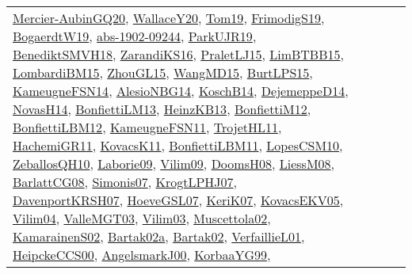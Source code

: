 {\begin{longtable}{lp{3cm}>{\raggedright}p{6cm}>{\raggedright}p{6cm}p{8cm}}
\href{papers/Mercier-AubinGQ20.pdf}{Mercier-AubinGQ20}\cite{Mercier-AubinGQ20}, \href{articles/WallaceY20.pdf}{WallaceY20}\cite{WallaceY20}, \href{papers/Tom19.pdf}{Tom19}\cite{Tom19}, \href{papers/FrimodigS19.pdf}{FrimodigS19}\cite{FrimodigS19}, \href{papers/BogaerdtW19.pdf}{BogaerdtW19}\cite{BogaerdtW19}, \href{articles/abs-1902-09244.pdf}{abs-1902-09244}\cite{abs-1902-09244}, \href{papers/ParkUJR19.pdf}{ParkUJR19}\cite{ParkUJR19}, \href{papers/BenediktSMVH18.pdf}{BenediktSMVH18}\cite{BenediktSMVH18}, \href{articles/ZarandiKS16.pdf}{ZarandiKS16}\cite{ZarandiKS16}, \href{papers/PraletLJ15.pdf}{PraletLJ15}\cite{PraletLJ15}, \href{papers/LimBTBB15.pdf}{LimBTBB15}\cite{LimBTBB15}, \href{papers/LombardiBM15.pdf}{LombardiBM15}\cite{LombardiBM15}, \href{papers/ZhouGL15.pdf}{ZhouGL15}\cite{ZhouGL15}, \href{articles/WangMD15.pdf}{WangMD15}\cite{WangMD15}, \href{papers/BurtLPS15.pdf}{BurtLPS15}\cite{BurtLPS15}, \href{articles/KameugneFSN14.pdf}{KameugneFSN14}\cite{KameugneFSN14}, \href{papers/AlesioNBG14.pdf}{AlesioNBG14}\cite{AlesioNBG14}, \href{papers/KoschB14.pdf}{KoschB14}\cite{KoschB14}, \href{papers/DejemeppeD14.pdf}{DejemeppeD14}\cite{DejemeppeD14}, \href{articles/NovasH14.pdf}{NovasH14}\cite{NovasH14}, \href{papers/BonfiettiLM13.pdf}{BonfiettiLM13}\cite{BonfiettiLM13}, \href{papers/HeinzKB13.pdf}{HeinzKB13}\cite{HeinzKB13}, \href{papers/BonfiettiM12.pdf}{BonfiettiM12}\cite{BonfiettiM12}, \href{papers/BonfiettiLBM12.pdf}{BonfiettiLBM12}\cite{BonfiettiLBM12}, \href{papers/KameugneFSN11.pdf}{KameugneFSN11}\cite{KameugneFSN11}, \href{articles/TrojetHL11.pdf}{TrojetHL11}\cite{TrojetHL11}, \href{articles/HachemiGR11.pdf}{HachemiGR11}\cite{HachemiGR11}, \href{articles/KovacsK11.pdf}{KovacsK11}\cite{KovacsK11}, \href{papers/BonfiettiLBM11.pdf}{BonfiettiLBM11}\cite{BonfiettiLBM11}, \href{articles/LopesCSM10.pdf}{LopesCSM10}\cite{LopesCSM10}, \href{articles/ZeballosQH10.pdf}{ZeballosQH10}\cite{ZeballosQH10}, \href{papers/Laborie09.pdf}{Laborie09}\cite{Laborie09}, \href{papers/Vilim09.pdf}{Vilim09}\cite{Vilim09}, \href{papers/DoomsH08.pdf}{DoomsH08}\cite{DoomsH08}, \href{articles/LiessM08.pdf}{LiessM08}\cite{LiessM08}, \href{papers/BarlattCG08.pdf}{BarlattCG08}\cite{BarlattCG08}, \href{articles/Simonis07.pdf}{Simonis07}\cite{Simonis07}, \href{papers/KrogtLPHJ07.pdf}{KrogtLPHJ07}\cite{KrogtLPHJ07}, \href{papers/DavenportKRSH07.pdf}{DavenportKRSH07}\cite{DavenportKRSH07}, \href{papers/HoeveGSL07.pdf}{HoeveGSL07}\cite{HoeveGSL07}, \href{papers/KeriK07.pdf}{KeriK07}\cite{KeriK07}, \href{papers/KovacsEKV05.pdf}{KovacsEKV05}\cite{KovacsEKV05}, \href{papers/Vilim04.pdf}{Vilim04}\cite{Vilim04}, \href{papers/ValleMGT03.pdf}{ValleMGT03}\cite{ValleMGT03}, \href{papers/Vilim03.pdf}{Vilim03}\cite{Vilim03}, \href{papers/Muscettola02.pdf}{Muscettola02}\cite{Muscettola02}, \href{papers/KamarainenS02.pdf}{KamarainenS02}\cite{KamarainenS02}, \href{papers/Bartak02a.pdf}{Bartak02a}\cite{Bartak02a}, \href{papers/Bartak02.pdf}{Bartak02}\cite{Bartak02}, \href{papers/VerfaillieL01.pdf}{VerfaillieL01}\cite{VerfaillieL01}, \href{articles/HeipckeCCS00.pdf}{HeipckeCCS00}\cite{HeipckeCCS00}, \href{papers/AngelsmarkJ00.pdf}{AngelsmarkJ00}\cite{AngelsmarkJ00}, \href{papers/KorbaaYG99.pdf}{KorbaaYG99}\cite{KorbaaYG99}, 
\end{longtable}}
